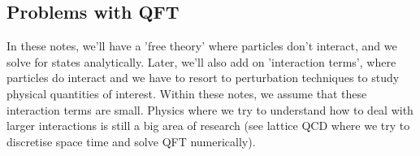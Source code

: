 \subsection{Problems with QFT} 
In these notes, we'll have a 'free theory' where particles don't interact, and we solve for states analytically. Later, we'll also add on 'interaction terms', where particles do interact and we have to resort to perturbation techniques to study physical quantities of interest. Within these notes, we assume that these interaction terms are small. Physics where we try to understand how to deal with larger interactions is still a big area of research (see lattice QCD where we try to discretise space time and solve QFT numerically). 

